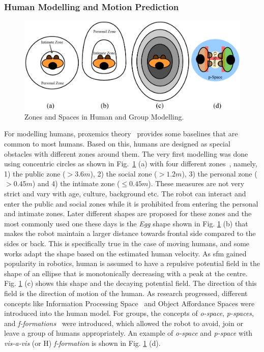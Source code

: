 \subsubsection{Human Modelling and Motion Prediction}
\begin{figure}[!h]
    \centering
    \includegraphics[width=0.95\columnwidth]{images/proxemics.eps}
    \caption{Zones and Spaces in Human and Group Modelling.}
    \label{fig:proxemics}
\end{figure}
For modelling humans, proxemics theory~\cite{hall_book_1966, mishra1983proxemics} provides some baselines that are common to most humans. Based on this, humans are designed as special obstacles with different zones around them. The very first modelling was done using concentric circles as shown in Fig.~\ref{fig:proxemics} (a) with four different zones~\cite{rios2015proxemics}, namely, 1) the public zone ($> 3.6m$), 2) the social zone ($> 1.2m$), 3) the personal zone ($> 0.45m$) and 4) the intimate zone ($\leq 0.45m$). These measures are not very strict and vary with age, culture, background etc. The robot can interact and enter the public and social zones while it is prohibited from entering the personal and intimate zones. Later different shapes are proposed for these zones \cite{rios2015proxemics} and the most commonly used one these days is the \textit{Egg} shape shown in Fig. \ref{fig:proxemics} (b) that makes the robot maintain a larger distance towards frontal side compared to the sides or back. This is specifically true in the case of moving humans, and some works \cite{kostavelis2016human} adapt the shape based on the estimated human velocity. As \acrshort{sfm} gained popularity in robotics, human is assumed to have a repulsive potential field in the shape of an ellipse that is monotonically decreasing with a peak at the centre. Fig. \ref{fig:proxemics} (c) shows this shape and the decaying potential field. The direction of this field is the direction of motion of the human. As research progressed, different concepts like Information Processing Space~\cite{kitazawa2010pedestrian} and Object Affordance Spaces were introduced into the human model. For groups, the concepts of \textit{o-space}, \textit{p-spaces}, and \textit{f-formations}~\cite{rios2015proxemics, kendon2010spacing} were introduced, which allowed the robot to avoid, join or leave a group of humans appropriately. An example of \textit{o-space} and \textit{p-space} with \textit{vis-a-vis} (or H) \textit{f-formation} is shown in Fig. \ref{fig:proxemics} (d). 

